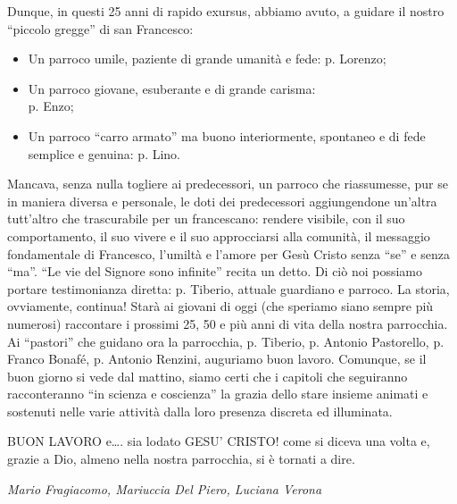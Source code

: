 Dunque, in questi 25 anni di rapido exursus, abbiamo avuto, a guidare il nostro “piccolo 
gregge” di san Francesco:
\begin{itemize}
	\item Un parroco umile, paziente di grande umanità e fede: p. Lorenzo;
	\item Un parroco giovane, esuberante e di grande carisma: \\p. Enzo;
	\item \sloppy Un parroco ``carro armato'' ma buono interiormente, spontaneo e di fede semplice e genuina: p. Lino.
\end{itemize}
Mancava, senza nulla togliere ai predecessori, un parroco che riassumesse, pur se in maniera 
diversa e personale, le doti dei predecessori aggiungendone un’altra tutt’altro che trascurabile per 
un francescano: rendere visibile, con il suo comportamento, il suo vivere e il suo approcciarsi alla 
comunità, il messaggio fondamentale di Francesco, l’umiltà e l’amore per Gesù Cristo senza “se” e 
senza “ma”.
“Le vie del Signore sono infinite” recita un detto. Di ciò noi possiamo portare testimonianza diretta: 
p. Tiberio, attuale guardiano e parroco. La storia, ovviamente, continua!
Starà ai giovani di oggi (che speriamo siano sempre più numerosi) raccontare i prossimi 25, 
50 e più anni di vita della nostra parrocchia. Ai “pastori” che guidano ora la parrocchia, p. Tiberio, 
p. Antonio Pastorello, p. Franco Bonafé, p. Antonio Renzini, auguriamo buon lavoro.
Comunque, se il buon giorno si vede dal mattino, siamo certi che i capitoli che seguiranno 
racconteranno “in scienza e coscienza” la grazia dello stare insieme animati e sostenuti nelle varie 
attività dalla loro presenza discreta ed illuminata.

\begin{samepage}
BUON LAVORO e…. sia lodato GESU’ CRISTO! come si diceva una volta e, grazie a Dio, 
almeno nella nostra parrocchia, si è tornati a dire.
\begin{flushright}
\textit{Mario Fragiacomo, Mariuccia Del Piero, Luciana Verona}
\end{flushright}
\end{samepage}